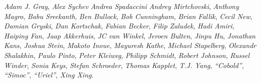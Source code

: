 \emph{Adam J. Gray},
\emph{Alex Sychev}
\emph{Andrea Spadaccini}
\emph{Andrey Mirtchovski},
\emph{Anthony Magro},
\emph{Babu Sreekanth},
\emph{Ben Bullock},
\emph{Bob Cunningham},
\emph{Brian Fallik},
\emph{Cecil New},
\emph{Damian Gryski},
\emph{Dan Kortschak},
\emph{Fabian Becker},
\emph{Filip Zaludek},
\emph{Hadi Amiri},
\emph{Haiping Fan},
\emph{Jaap Akkerhuis},
\emph{JC van Winkel},
\emph{Jeroen Bulten},
\emph{Jinpu Hu},
\emph{Jonathan Kans},
\emph{Joshua Stein},
\emph{Makoto Inoue},
\emph{Mayuresh Kathe},
\emph{Michael Stapelberg},
\emph{Olexandr Shalakhin},
\emph{Paulo Pinto},
\emph{Peter Kleiweg},
\emph{Philipp Schmidt},
\emph{Robert Johnson},
\emph{Russel Winder},
\emph{Sonia Keys},
\emph{Stefan Schroeder},
\emph{Thomas Kapplet},
\emph{T.J. Yang},
\emph{``Cobold''},
\emph{``Simoc''},
\emph{``Uriel''},
\emph{Xing Xing}.
